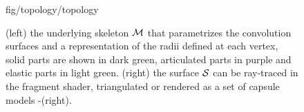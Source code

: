 \begin{figure}[h]
\centering
\begin{overpic} 
[width=\linewidth]
{fig/topology/topology}
\end{overpic}
\caption{(left) the underlying skeleton $\mathcal{M}$ that parametrizes the convolution surfaces and a representation of the radii defined at each vertex, solid parts are shown in dark green, articulated parts in purple and elastic parts in light green.
 (right) the surface $\mathcal{S}$ can be ray-traced in the fragment shader, triangulated or rendered as a set of capsule models -(right). }
\label{fig:topology}
\end{figure}